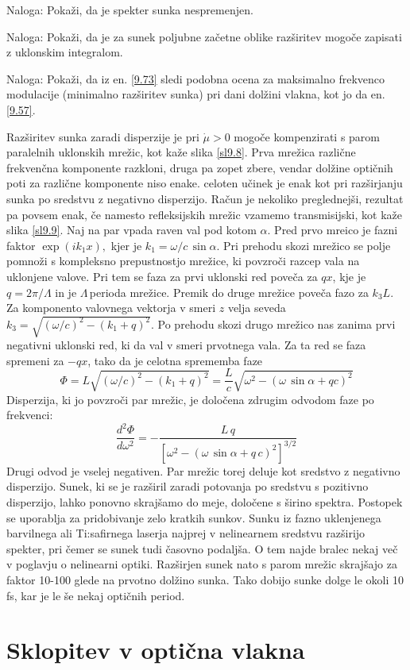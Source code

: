 Naloga: Pokaži, da je spekter sunka nespremenjen.

Naloga: Pokaži, da je za sunek poljubne začetne oblike razširitev
mogoče zapisati z uklonskim integralom.

Naloga: Pokaži, da iz en. \ref{9.73} sledi podobna ocena za maksimalno
frekvenco modulacije (minimalno razširitev sunka) pri dani dolžini
vlakna, kot jo da en. \ref{9.57}.

Razširitev sunka zaradi disperzije je pri $\dot{\mu}>0$ mogoče kompenzirati
s parom paralelnih uklonskih mrežic, kot kaže slika \ref{sl9.8}.
Prva mrežica različne frekvenčna komponente razkloni, druga pa zopet
zbere, vendar dolžine optičnih poti za različne komponente niso enake.
celoten učinek je enak kot pri razširjanju sunka po sredstvu z negativno
disperzijo. Račun je nekoliko preglednejši, rezultat pa povsem enak,
če namesto refleksijskih mrežic vzamemo transmisijski, kot kaže slika
\ref{sl9.9}. Naj na par vpada raven val pod kotom $\alpha.$ Pred
prvo mre\textquotedbl{}ico je fazni faktor $\exp\left(ik_{1}x\right),$
kjer je $k_{1}=\omega/c\,\sin\alpha$. Pri prehodu skozi mrežico se
polje pomnoži s kompleksno prepustnostjo mrežice, ki povzroči razcep
vala na uklonjene valove. Pri tem se faza za prvi uklonski red poveča
za $qx$, kje je $q=2\pi/\Lambda$ in je $\Lambda\,$perioda mrežice.
Premik do druge mrežice poveča fazo za $k_{3}L$. Za komponento valovnega
vektorja v smeri $z$ velja seveda $k_{3}=\sqrt{\left(\omega/c\right)^{2}-\left(k_{1}+q\right)^{2}}$.
Po prehodu skozi drugo mrežico nas zanima prvi negativni uklonski
red, ki da val v smeri prvotnega vala. Za ta red se faza spremeni
za $-qx$, tako da je celotna sprememba faze 
\begin{equation}
\Phi=L\sqrt{\left(\omega/c\right)^{2}-\left(k_{1}+q\right)^{2}}=
\frac{L}{c}\sqrt{\omega^{2}-\left(\omega\,\sin\alpha+qc\right)^{2}}\label{9.75}
\end{equation}
 Disperzija, ki jo povzroči par mrežic, je določena zdrugim odvodom
faze po frekvenci: 
\begin{equation}
\frac{d^{2}\Phi}{d\omega^{2}}=-\frac{L\, q}{\left[\omega^{2}-\left(\omega\,\sin\alpha+q\, c\right)^{2}\right]^{3/2}}\label{9.76}
\end{equation}
 Drugi odvod je vselej negativen. Par mrežic torej deluje kot sredstvo
z negativno disperzijo. Sunek, ki se je razširil zaradi potovanja
po sredstvu s pozitivno disperzijo, lahko ponovno skrajšamo do meje,
določene s širino spektra. Postopek se uporablja za pridobivanje zelo
kratkih sunkov. Sunku iz fazno uklenjenega barvilnega ali Ti:safirnega
laserja najprej v nelinearnem sredstvu razširijo spekter, pri čemer
se sunek tudi časovno podaljša. O tem najde bralec nekaj več v poglavju
o nelinearni optiki. Razširjen sunek nato s parom mrežic skrajšajo
za faktor 10-100 glede na prvotno dolžino sunka. Tako dobijo sunke
dolge le okoli 10 fs, kar je le še nekaj optičnih period.

\section{Sklopitev v optična vlakna}
